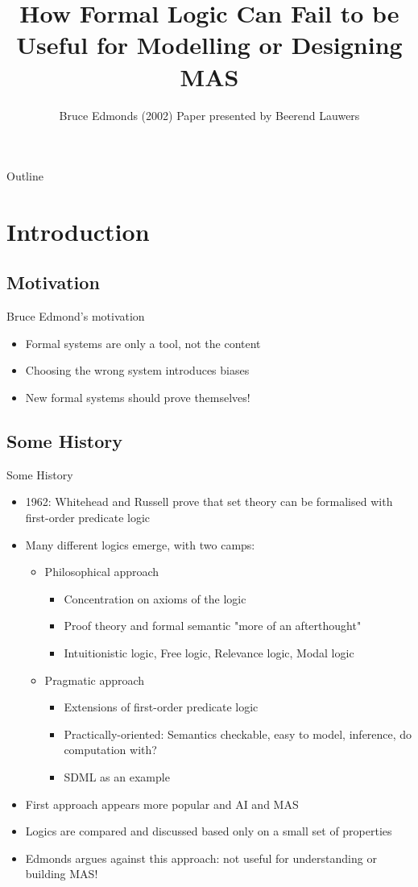 \documentclass[10pt,a4paper]{beamer}
\author{Bruce Edmonds (2002)
\newline
\newline
Paper presented by Beerend Lauwers}
\title{How Formal Logic Can Fail to be Useful for Modelling or Designing MAS}
\begin{document}
	
\frame{\titlepage}

\begin{frame}{Outline}
\tableofcontents
\end{frame}

\section{Introduction}
\subsection{Motivation}

\begin{frame}{Bruce Edmond's motivation}
\begin{itemize}
\item Formal systems are only a tool, not the content
\item Choosing the wrong system introduces biases
\item New formal systems should prove themselves!
\end{itemize}
\end{frame}

\subsection{Some History}

\begin{frame}{Some History}
\begin{itemize}
\item 1962: Whitehead and Russell prove that set theory can be formalised with first-order predicate logic
\item Many different logics emerge, with two camps:
\begin{itemize}
\item Philosophical approach
\begin{itemize}
\item Concentration on axioms of the logic
\item Proof theory and formal semantic "more of an afterthought"
\item Intuitionistic logic, Free logic, Relevance logic, Modal logic
\end{itemize}
\item Pragmatic approach
\begin{itemize}
\item Extensions of first-order predicate logic
\item Practically-oriented: Semantics checkable, easy to model, inference, do computation with?
\item SDML as an example
\end{itemize}
\end{itemize}
\item First approach appears more popular and AI and MAS
\item Logics are compared and discussed based only on a small set of properties
\item Edmonds argues against this approach: not useful for understanding or building MAS!
\end{itemize}
\end{frame}
\end{document}

